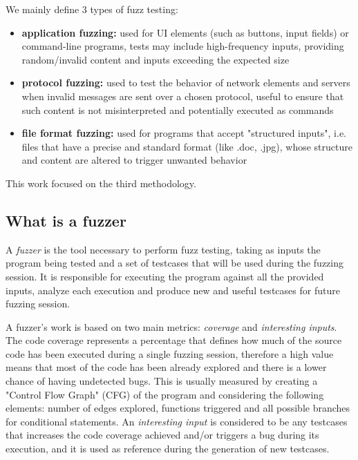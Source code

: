 
We mainly define 3 types of fuzz testing:
\begin{itemize}
    \item \textbf{application fuzzing:} used for UI elements (such as buttons, input fields) or command-line programs, tests may include high-frequency inputs, providing random/invalid content and inputs exceeding the expected size
    \item \textbf{protocol fuzzing:} used to test the behavior of network elements and servers when invalid messages are sent over a chosen protocol, useful to ensure that such content is not misinterpreted and potentially executed as commands
    \item  \textbf{file format fuzzing:} used for programs that accept "structured inputs", i.e. files that have a precise and standard format (like .doc, .jpg), whose structure and content are altered to trigger unwanted behavior
\end{itemize}
This work focused on the third methodology.


\subsection{What is a fuzzer}  \label{fuzzers}
A \textit{fuzzer} is the tool necessary to perform fuzz testing, taking as inputs the program being tested and a set of testcases that will be used during the fuzzing session. It is responsible for executing the program against all the provided inputs, analyze each execution and produce new and useful testcases for future fuzzing session.

A fuzzer's work is based on two main metrics: \textit{coverage} and \textit{interesting inputs}. The code coverage represents a percentage that defines how much of the source code has been executed during a single fuzzing session, therefore a high value means that most of the code has been already explored and there is a lower chance of having undetected bugs. This is usually measured by creating a "Control Flow Graph" (CFG) of the program and considering the following elements: number of edges explored, functions triggered and all possible branches for conditional statements. An \textit{interesting input} is considered to be any testcases that increases the code coverage achieved and/or triggers a bug during its execution, and it is used as reference during the generation of new testcases.

